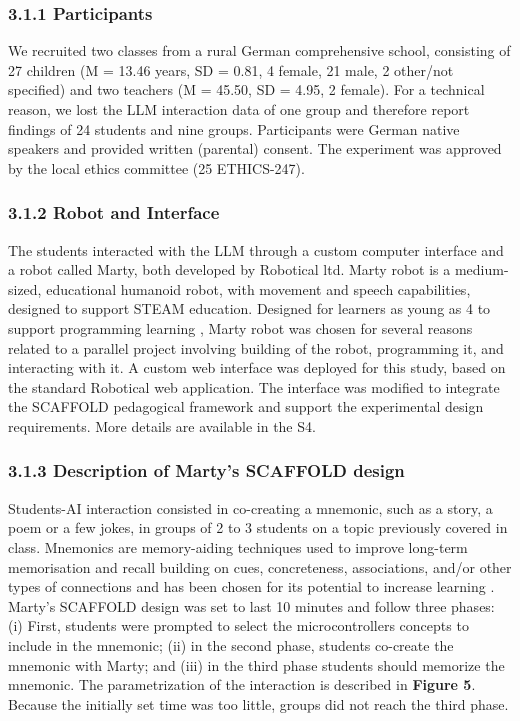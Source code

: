 \documentclass[fleqn,10pt]{wlscirep}
\begin{document}
\subsubsection*{3.1.1 Participants}

We recruited two classes from a rural German comprehensive school, consisting of 27 children (M = 13.46 years, SD = 0.81, 4 female, 21 male, 2 other/not specified) and two teachers (M = 45.50, SD = 4.95, 2 female). For a technical reason, we lost the LLM interaction data of one group and therefore report findings of 24 students and nine groups. Participants were German native speakers and provided written (parental) consent. The experiment was approved by the local ethics committee (25 ETHICS-247).

\subsubsection*{3.1.2 Robot and Interface}

The students interacted with the LLM through a custom computer interface and a robot called Marty, both developed by Robotical ltd. Marty robot is a medium-sized, educational humanoid robot, with movement and speech capabilities, designed to support STEAM education. Designed for learners as young as 4 to support programming learning \cite{Robotical2024}, Marty robot was chosen for several reasons related to a parallel project involving building of the robot, programming it, and interacting with it. A custom web interface was deployed for this study, based on the standard Robotical web application. The interface was modified to integrate the SCAFFOLD pedagogical framework and support the experimental design requirements. More details are available in the S4.

\subsubsection*{3.1.3 Description of Marty's SCAFFOLD design}

Students-AI interaction consisted in co-creating a mnemonic, such as a story, a poem or a few jokes, in groups of 2 to 3 students on a topic previously covered in class. Mnemonics are memory-aiding techniques used to improve long-term memorisation and recall building on cues, concreteness, associations, and/or other types of connections and has been chosen for its potential to increase learning \cite{Clark1991, Fung2024}. Marty's SCAFFOLD design was set to last 10 minutes and follow three phases: (i) First, students were prompted to select the microcontrollers concepts to include in the mnemonic; (ii) in the second phase, students co-create the mnemonic with Marty; and (iii) in the third phase students should memorize the mnemonic. The parametrization of the interaction is described in \textbf{Figure 5}. Because the initially set time was too little, groups did not reach the third phase.
\end{document}
